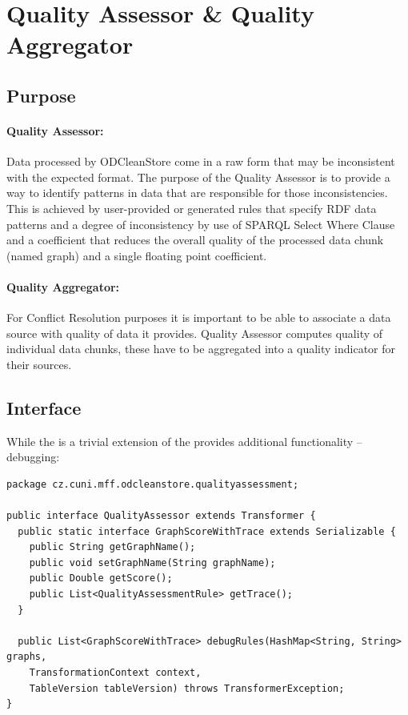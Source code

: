 \section{Quality Assessor \& Quality Aggregator}
\subsection{Purpose}

\paragraph{Quality Assessor:}
Data processed by ODCleanStore come in a raw form that may be inconsistent with the expected format. The purpose of the Quality Assessor is to provide a way to identify patterns in data that are responsible for those inconsistencies. This is achieved by user-provided or generated rules that specify RDF data patterns and a degree of inconsistency by use of SPARQL Select Where Clause and a coefficient that reduces the overall quality of the processed data chunk (named graph) and a single floating point coefficient.

\paragraph{Quality Aggregator:}
For Conflict Resolution purposes it is important to be able to associate a data source with quality of data it provides. Quality Assessor computes quality of individual data chunks, these have to be aggregated into a quality indicator for their sources.

\subsection{Interface}

While the  is a trivial extension of  the  provides additional functionality -- debugging:

\begin{lstlisting}[caption=Quality Assessor interface,label=lst:qualityAssessor]
package cz.cuni.mff.odcleanstore.qualityassessment;

public interface QualityAssessor extends Transformer {
  public static interface GraphScoreWithTrace extends Serializable {
    public String getGraphName();
    public void setGraphName(String graphName);
    public Double getScore();
    public List<QualityAssessmentRule> getTrace();
  }

  public List<GraphScoreWithTrace> debugRules(HashMap<String, String> graphs,
    TransformationContext context,
    TableVersion tableVersion) throws TransformerException;
}
\end{lstlisting}

